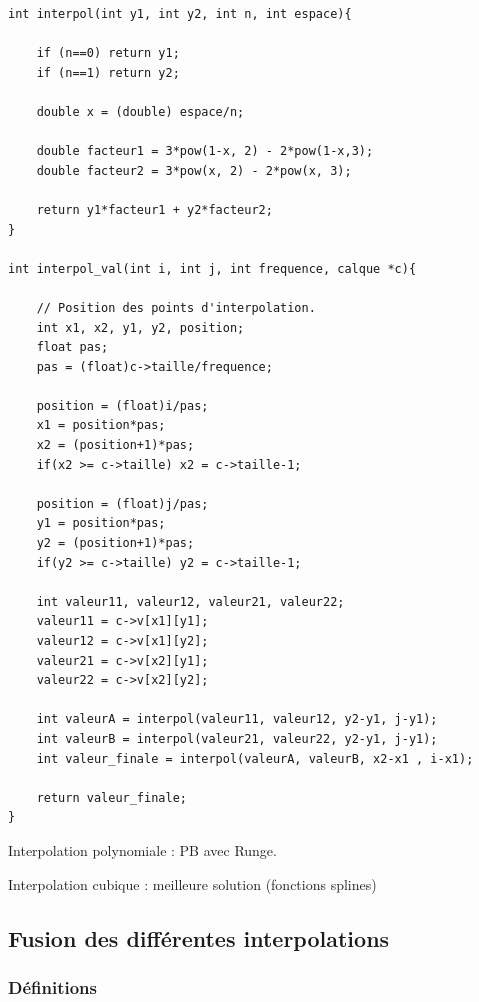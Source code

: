 \documentclass[12pt, a4paper]{article}
\begin{document}
\bigskip
\begin{lstlisting}[caption=Code C - Interpolation non linéaire]
int interpol(int y1, int y2, int n, int espace){

    if (n==0) return y1;
    if (n==1) return y2;

    double x = (double) espace/n;

    double facteur1 = 3*pow(1-x, 2) - 2*pow(1-x,3);
    double facteur2 = 3*pow(x, 2) - 2*pow(x, 3);

    return y1*facteur1 + y2*facteur2;
}

int interpol_val(int i, int j, int frequence, calque *c){

    // Position des points d'interpolation.
    int x1, x2, y1, y2, position;
    float pas;
    pas = (float)c->taille/frequence;

    position = (float)i/pas;
    x1 = position*pas;
    x2 = (position+1)*pas;
    if(x2 >= c->taille) x2 = c->taille-1;

    position = (float)j/pas;
    y1 = position*pas;
    y2 = (position+1)*pas;
    if(y2 >= c->taille) y2 = c->taille-1;

    int valeur11, valeur12, valeur21, valeur22;
    valeur11 = c->v[x1][y1];
    valeur12 = c->v[x1][y2];
    valeur21 = c->v[x2][y1];
    valeur22 = c->v[x2][y2];

    int valeurA = interpol(valeur11, valeur12, y2-y1, j-y1);
    int valeurB = interpol(valeur21, valeur22, y2-y1, j-y1);
    int valeur_finale = interpol(valeurA, valeurB, x2-x1 , i-x1);

    return valeur_finale;
}

\end{lstlisting}

\bigskip
Interpolation polynomiale : PB avec Runge.

\bigskip
Interpolation cubique : meilleure solution (fonctions splines)

\clearpage

\subsection{Fusion des différentes interpolations}

\subsubsection{Définitions}
\end{document}
